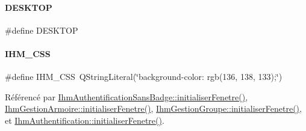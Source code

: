 \paragraph{\texorpdfstring{D\+E\+S\+K\+T\+OP}{DESKTOP}}
{\footnotesize\ttfamily \#define D\+E\+S\+K\+T\+OP}

\mbox{\label{e-stock_8h_a7185157bd11830373a0f95d0dc88b2c3}} 
\paragraph{\texorpdfstring{I\+H\+M\+\_\+\+C\+SS}{IHM\_CSS}}
{\footnotesize\ttfamily \#define I\+H\+M\+\_\+\+C\+SS~Q\+String\+Literal(\char`\"{}background-\/color\+: rgb(136, 138, 133);\char`\"{})}



Référencé par \hyperlink{class_ihm_authentification_sans_badge_a5804d43d13e39e3e4890f7b08c89cb6c}{Ihm\+Authentification\+Sans\+Badge\+::initialiser\+Fenetre()}, \hyperlink{class_ihm_gestion_armoire_a3bd9b576cab980cae3dc591f412309fc}{Ihm\+Gestion\+Armoire\+::initialiser\+Fenetre()}, \hyperlink{class_ihm_gestion_groupe_a7206d6ced32c6c5e8be7ee474195ca73}{Ihm\+Gestion\+Groupe\+::initialiser\+Fenetre()}, et \hyperlink{class_ihm_authentification_a4698f8d828773e365104d78e3ac3b9ce}{Ihm\+Authentification\+::initialiser\+Fenetre()}.

